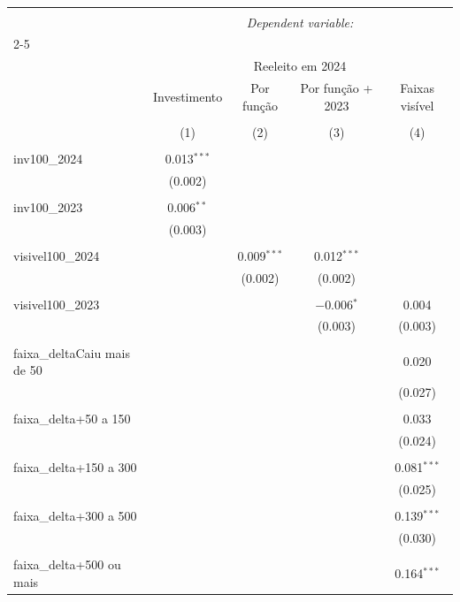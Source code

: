 
\begin{table}[!htbp] \centering 
  \caption{} 
  \label{} 
\begin{tabular}{@{\extracolsep{5pt}}lcccc} 
\\[-1.8ex]\hline 
\hline \\[-1.8ex] 
 & \multicolumn{4}{c}{\textit{Dependent variable:}} \\ 
\cline{2-5} 
\\[-1.8ex] & \multicolumn{4}{c}{Reeleito em 2024} \\ 
 & Investimento & Por função & Por função + 2023 & Faixas visível \\ 
\\[-1.8ex] & (1) & (2) & (3) & (4)\\ 
\hline \\[-1.8ex] 
 inv100\_2024 & 0.013$^{***}$ &  &  &  \\ 
  & (0.002) &  &  &  \\ 
  & & & & \\ 
 inv100\_2023 & 0.006$^{**}$ &  &  &  \\ 
  & (0.003) &  &  &  \\ 
  & & & & \\ 
 visivel100\_2024 &  & 0.009$^{***}$ & 0.012$^{***}$ &  \\ 
  &  & (0.002) & (0.002) &  \\ 
  & & & & \\ 
 visivel100\_2023 &  &  & $-$0.006$^{*}$ & 0.004 \\ 
  &  &  & (0.003) & (0.003) \\ 
  & & & & \\ 
 faixa\_deltaCaiu mais de 50 &  &  &  & 0.020 \\ 
  &  &  &  & (0.027) \\ 
  & & & & \\ 
 faixa\_delta+50 a 150 &  &  &  & 0.033 \\ 
  &  &  &  & (0.024) \\ 
  & & & & \\ 
 faixa\_delta+150 a 300 &  &  &  & 0.081$^{***}$ \\ 
  &  &  &  & (0.025) \\ 
  & & & & \\ 
 faixa\_delta+300 a 500 &  &  &  & 0.139$^{***}$ \\ 
  &  &  &  & (0.030) \\ 
  & & & & \\ 
 faixa\_delta+500 ou mais &  &  &  & 0.164$^{***}$ \\ 

\end{tabular}
\end{table}
